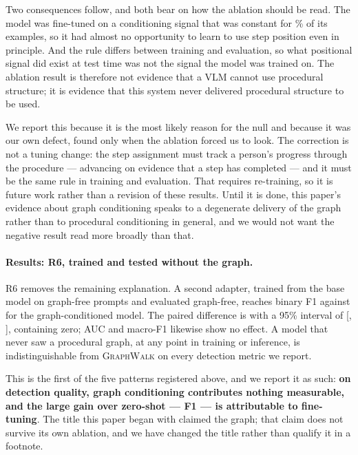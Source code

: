 \documentclass[10pt,twocolumn]{article}
\newcommand{\ourmodel}{\textsc{GraphWalk}}
\begin{document}
Two consequences follow, and both bear on how the ablation should be read. The
model was fine-tuned on a conditioning signal that was constant for
\satTrain{}\% of its examples, so it had almost no opportunity to learn to use
step position even in principle. And the rule differs between training and
evaluation, so what positional signal did exist at test time was not the signal
the model was trained on. The ablation result is therefore not evidence that a
VLM cannot use procedural structure; it is evidence that this system never
delivered procedural structure to be used.

We report this because it is the most likely reason for the null and because it
was our own defect, found only when the ablation forced us to look. The
correction is not a tuning change: the step assignment must track a person's
progress through the procedure --- advancing on evidence that a step has
completed --- and it must be the same rule in training and evaluation. That
requires re-training, so it is future work rather than a revision of these
results. Until it is done, this paper's evidence about graph conditioning speaks
to a degenerate delivery of the graph rather than to procedural conditioning in
general, and we would not want the negative result read more broadly than that.

\paragraph{Results: R6, trained and tested without the graph.}
R6 removes the remaining explanation. A second adapter, trained from the base
model on graph-free prompts and evaluated graph-free, reaches \ntF{} binary F1
against \resF{} for the graph-conditioned model. The paired difference is
\ntDelta{} with a 95\% interval of [\ntDeltaLo{}, \ntDeltaHi{}], containing zero;
AUC and macro-F1 likewise show no effect. A model that never saw a procedural
graph, at any point in training or inference, is indistinguishable from
\ourmodel{} on every detection metric we report.

This is the first of the five patterns registered above, and we report it as
such: \textbf{on detection quality, graph conditioning contributes nothing
measurable, and the large gain over zero-shot --- \resDelta{} F1 --- is
attributable to fine-tuning}. The title this paper began with claimed the graph;
that claim does not survive its own ablation, and we have changed the title
rather than qualify it in a footnote.
\end{document}
